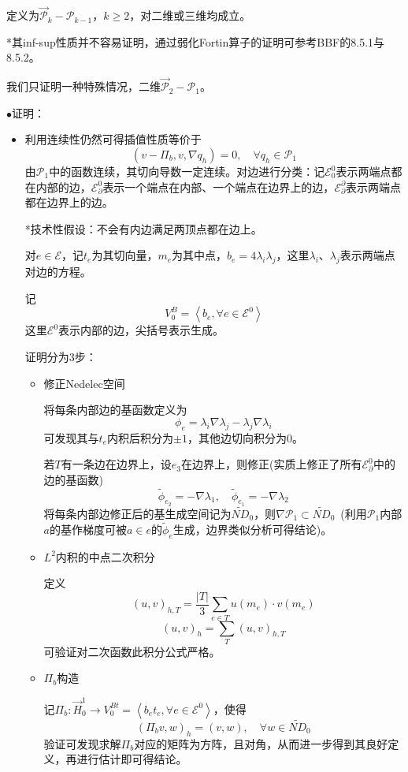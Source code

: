 \documentclass[a4paper,UTF8,fontset=windows]{ctexart}
\newcommand*{\ce}{\mathcal{E}}
\newcommand*{\cp}{\mathcal{P}}
\newcommand{\proo}[1]{{\kaishu $\bullet$证明：
\begin{itemize}
    \item[] #1
\end{itemize}
}}
\begin{document}
定义为$\vec{\cp}_k-\cp_{k-1}$，$k\ge2$，对二维或三维均成立。

*其inf-sup性质并不容易证明，通过弱化Fortin算子的证明可参考BBF的8.5.1与8.5.2。

我们只证明一种特殊情况，二维$\vec{\cp}_2-\cp_1$。

\proo{
    利用连续性仍然可得插值性质等价于
    $$(v-\Pi_b,v,\nabla q_h)=0,\quad\forall q_h\in\cp_1$$
    由$\cp_1$中的函数连续，其切向导数一定连续。对边进行分类：记$\ce_0^0$表示两端点都在内部的边，$\ce_\partial^0$表示一个端点在内部、一个端点在边界上的边，$\ce_\partial^\partial$表示两端点都在边界上的边。

    *技术性假设：不会有内边满足两顶点都在边上。

    对$e\in\ce$，记$t_e$为其切向量，$m_e$为其中点，$b_e=4\lambda_i\lambda_j$，这里$\lambda_i$、$\lambda_j$表示两端点对边的方程。

    记
    $$V_0^B=\left<b_e,\forall e\in\ce^0\right>$$
    这里$\ce^0$表示内部的边，尖括号表示生成。

    证明分为3步：
    \begin{itemize}
        \item 修正Nedelec空间
        
        将每条内部边的基函数定义为
        $$\phi_e=\lambda_i\nabla\lambda_j-\lambda_j\nabla\lambda_i$$
        可发现其与$t_e$内积后积分为$\pm1$，其他边切向积分为0。

        若$T$有一条边在边界上，设$e_3$在边界上，则修正(实质上修正了所有$\ce_\partial^0$中的边的基函数)
        $$\tilde\phi_{e_2}=-\nabla\lambda_1,\quad\tilde\phi_{e_1}=-\nabla\lambda_2$$
        将每条内部边修正后的基生成空间记为$\widetilde{ND}_0$，则$\nabla\cp_1\subset\widetilde{ND}_0$\ (利用$\cp_1$内部$a$的基作梯度可被$a\in e$的$\tilde\phi_e$生成，边界类似分析可得结论)。

        \item $L^2$内积的中点二次积分
        
        定义
        $$(u,v)_{h,T}=\frac{|T|}{3}\sum_{e\in T}u(m_e)\cdot v(m_e)$$
        $$(u,v)_h=\sum_T(u,v)_{h,T}$$
        可验证对二次函数此积分公式严格。

        \item $\Pi_b$构造
        
        记$\Pi_b:\vec{H}_0^1\to V_0^{Bt}=\left<b_et_e,\forall e\in\ce^0\right>$，使得
        $$(\Pi_bv,w)_h=(v,w),\quad\forall w\in\widetilde{ND}_0$$
        验证可发现求解$\Pi_b$对应的矩阵为方阵，且对角，从而进一步得到其良好定义，再进行估计即可得结论。
    \end{itemize}
}
\end{document}
